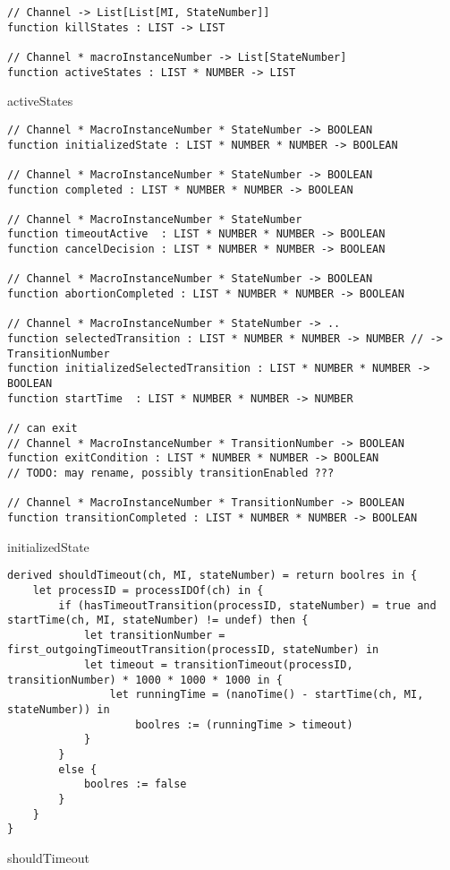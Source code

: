 \begin{listing}[H]
\begin{verbatim}
// Channel -> List[List[MI, StateNumber]]
function killStates : LIST -> LIST

// Channel * macroInstanceNumber -> List[StateNumber]
function activeStates : LIST * NUMBER -> LIST
\end{verbatim}
\caption{activeStates}
\label{lst:asm:activeStates}
\end{listing}



\begin{listing}[H]
\begin{verbatim}
// Channel * MacroInstanceNumber * StateNumber -> BOOLEAN
function initializedState : LIST * NUMBER * NUMBER -> BOOLEAN

// Channel * MacroInstanceNumber * StateNumber -> BOOLEAN
function completed : LIST * NUMBER * NUMBER -> BOOLEAN

// Channel * MacroInstanceNumber * StateNumber
function timeoutActive  : LIST * NUMBER * NUMBER -> BOOLEAN
function cancelDecision : LIST * NUMBER * NUMBER -> BOOLEAN

// Channel * MacroInstanceNumber * StateNumber -> BOOLEAN
function abortionCompleted : LIST * NUMBER * NUMBER -> BOOLEAN

// Channel * MacroInstanceNumber * StateNumber -> ..
function selectedTransition : LIST * NUMBER * NUMBER -> NUMBER // -> TransitionNumber
function initializedSelectedTransition : LIST * NUMBER * NUMBER -> BOOLEAN
function startTime  : LIST * NUMBER * NUMBER -> NUMBER

// can exit
// Channel * MacroInstanceNumber * TransitionNumber -> BOOLEAN
function exitCondition : LIST * NUMBER * NUMBER -> BOOLEAN
// TODO: may rename, possibly transitionEnabled ???

// Channel * MacroInstanceNumber * TransitionNumber -> BOOLEAN
function transitionCompleted : LIST * NUMBER * NUMBER -> BOOLEAN
\end{verbatim}
\caption{initializedState}
\label{lst:asm:initializedState}
\end{listing}



\begin{listing}[H]
\begin{verbatim}
derived shouldTimeout(ch, MI, stateNumber) = return boolres in {
    let processID = processIDOf(ch) in {
        if (hasTimeoutTransition(processID, stateNumber) = true and startTime(ch, MI, stateNumber) != undef) then {
            let transitionNumber = first_outgoingTimeoutTransition(processID, stateNumber) in
            let timeout = transitionTimeout(processID, transitionNumber) * 1000 * 1000 * 1000 in {
                let runningTime = (nanoTime() - startTime(ch, MI, stateNumber)) in
                    boolres := (runningTime > timeout)
            }
        }
        else {
            boolres := false
        }
    }
}
\end{verbatim}
\caption{shouldTimeout}
\label{lst:asm:shouldTimeout}
\end{listing}


